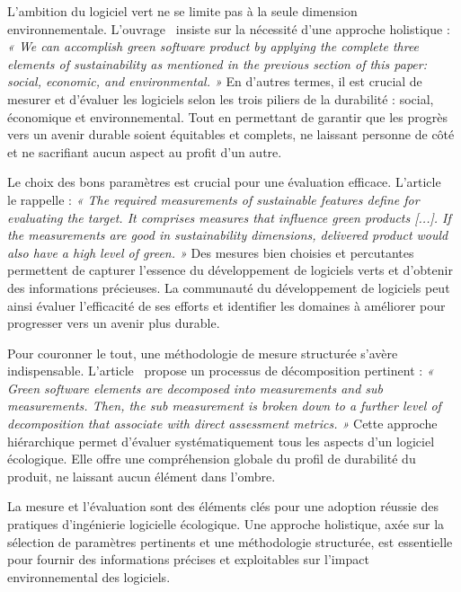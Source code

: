 L'ambition du logiciel vert ne se limite pas à la seule dimension environnementale. L'ouvrage~\cite{GreenMeasurementStructure} insiste sur la nécessité d'une approche holistique : \emph{« We can accomplish green software product by applying the complete three elements of sustainability as mentioned in the previous section of this paper: social, economic, and environmental. »} En d'autres termes, il est crucial de mesurer et d'évaluer les logiciels selon les trois piliers de la durabilité : social, économique et environnemental. Tout en permettant de garantir que les progrès vers un avenir durable soient équitables et complets, ne laissant personne de côté et ne sacrifiant aucun aspect au profit d'un autre.


Le choix des bons paramètres est crucial pour une évaluation efficace. L'article~\cite{GreenMeasurementStructure} le rappelle : \emph{« The required measurements of sustainable features define for evaluating the target. It comprises measures that influence green products [...]. If the measurements are good in sustainability dimensions, delivered product would also have a high level of green. »} Des mesures bien choisies et percutantes permettent de capturer l'essence du développement de logiciels verts et d'obtenir des informations précieuses. La communauté du développement de logiciels peut ainsi évaluer l'efficacité de ses efforts et identifier les domaines à améliorer pour progresser vers un avenir plus durable.


Pour couronner le tout, une méthodologie de mesure structurée s'avère indispensable. L'article~\cite{GreenMeasurementStructure} propose un processus de décomposition pertinent : \emph{« Green software elements are decomposed into measurements and sub measurements. Then, the sub measurement is broken down to a further level of decomposition that associate with direct assessment metrics. »} Cette approche hiérarchique permet d'évaluer systématiquement tous les aspects d'un logiciel écologique. Elle offre une compréhension globale du profil de durabilité du produit, ne laissant aucun élément dans l'ombre.


La mesure et l'évaluation sont des éléments clés pour une adoption réussie des pratiques d'ingénierie logicielle écologique. Une approche holistique, axée sur la sélection de paramètres pertinents et une méthodologie structurée, est essentielle pour fournir des informations précises et exploitables sur l'impact environnemental des logiciels.

